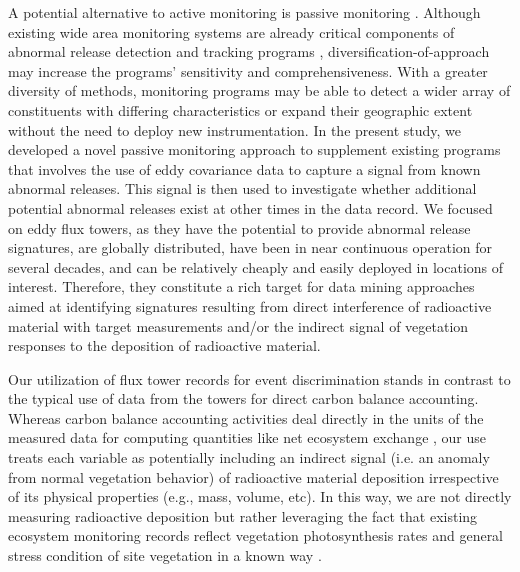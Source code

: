 \documentclass{article}
\begin{document}
A potential alternative to active monitoring is passive monitoring \citep[e.g., the German Integrated Measuring and Information system and the International Monitoring System,][]{bieringerMonitoringGroundlevelAir2004}. Although existing wide area monitoring systems are already critical components of abnormal release detection and tracking programs \citep{mediciIMSRadionuclideNetwork2001}, diversification-of-approach may increase the programs' sensitivity and comprehensiveness. With a greater diversity of methods, monitoring programs may be able to detect a wider array of constituents with differing characteristics or expand their geographic extent without the need to deploy new instrumentation. In the present study, we developed a novel passive monitoring approach to supplement existing programs that involves the use of eddy covariance data to capture a signal from known abnormal releases. This signal is then used to investigate whether additional potential abnormal releases exist at other times in the data record. We focused on eddy flux towers, as they have the potential to provide abnormal release signatures, are globally distributed, have been in near continuous operation for several decades, and can be relatively cheaply and easily deployed in locations of interest. Therefore, they constitute a rich target for data mining approaches aimed at identifying signatures resulting from direct interference of radioactive material with target measurements and/or the indirect signal of vegetation responses to the deposition of radioactive material.

Our utilization of flux tower records for event discrimination stands in contrast to the typical use of data from the towers for direct carbon balance accounting. Whereas carbon balance accounting activities deal directly in the units of the measured data for computing quantities like net ecosystem exchange \citep{baldocchiInterannualVariabilityNet2018}, our use treats each variable as potentially including an indirect signal (i.e. an anomaly from normal vegetation behavior) of radioactive material deposition irrespective of its physical properties (e.g., mass, volume, etc). In this way, we are not directly measuring radioactive deposition but rather leveraging the fact that existing ecosystem monitoring records reflect vegetation photosynthesis rates and general stress condition of site vegetation in a known way \citep{nobelPhysicochemicalEnvironmentalPlant2020}.
\end{document}
